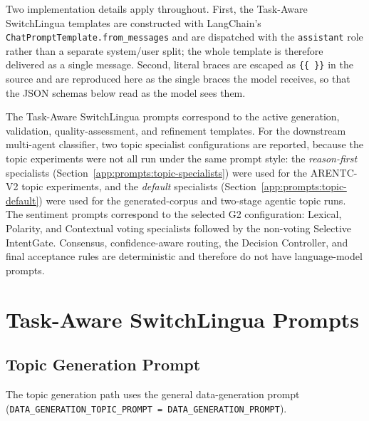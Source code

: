 Two implementation details apply throughout. First, the Task-Aware SwitchLingua
templates are constructed with LangChain's
\texttt{ChatPromptTemplate.from\_messages} and are dispatched with the
\texttt{assistant} role rather than a separate system/user split; the whole
template is therefore delivered as a single message. Second, literal braces are
escaped as \texttt{\{\{~\}\}} in the source and are reproduced here as the
single braces the model receives, so that the JSON schemas below read as the
model sees them.

The Task-Aware SwitchLingua prompts correspond to the active generation,
validation, quality-assessment, and refinement templates. For the downstream
multi-agent classifier, two topic specialist configurations are reported,
because the topic experiments were not all run under the same prompt style:
the \emph{reason-first} specialists
(Section~\ref{app:prompts:topic-specialists}) were used for the ARENTC-V2 topic
experiments, and the \emph{default} specialists
(Section~\ref{app:prompts:topic-default}) were used for the generated-corpus
and two-stage agentic topic runs. The sentiment prompts correspond to the
selected G2 configuration: Lexical, Polarity, and Contextual voting specialists
followed by the non-voting Selective IntentGate. Consensus, confidence-aware
routing, the Decision Controller, and final acceptance rules are deterministic
and therefore do not have language-model prompts.


\section{Task-Aware SwitchLingua Prompts}
\label{app:prompts:switchlingua}

\subsection{Topic Generation Prompt}
\label{app:prompt:topic-generation}

The topic generation path uses the general data-generation prompt
(\texttt{DATA\_GENERATION\_TOPIC\_PROMPT =
DATA\_GENERATION\_PROMPT}).


